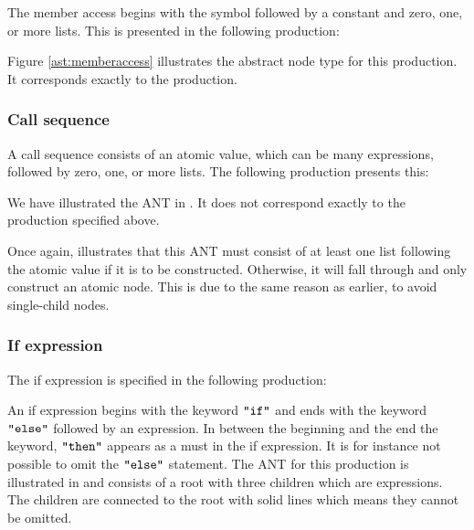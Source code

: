 The member access begins with the  symbol followed by a constant and
zero, one, or more lists. This is presented in the following production:

\begin{ebnf}
\end{ebnf}

Figure \ref{ast:memberaccess} illustrates the abstract node type for this
production. It corresponds exactly to the production.



\subsubsection{Call sequence}

A call sequence consists of an atomic value, which can be many expressions,
followed by zero, one, or more lists. The following production presents this:

\begin{ebnf}
\end{ebnf}

We have illustrated the ANT in . It does not correspond
exactly to the production specified above.




Once again,  illustrates that this ANT must consist of
at least one list following the atomic value if it is to be constructed.
Otherwise, it will fall through and only construct an atomic node. This is due
to the same reason as earlier, to avoid single-child nodes.

\subsubsection{If expression}
The if expression is specified in the following production:

\begin{ebnf}
\end{ebnf}

An if expression begins with the keyword $\texttt{"if"}$ and ends with the keyword
$\texttt{"else"}$ followed by an expression. In between the beginning and the end the
keyword, $\texttt{"then"}$ appears as a must in the if expression. It is for instance not
possible to omit the $\texttt{"else"}$ statement. The ANT for this production is
illustrated in  and consists of a root with three children
which are expressions. The children are connected to the root with solid lines
which means they cannot be omitted.

